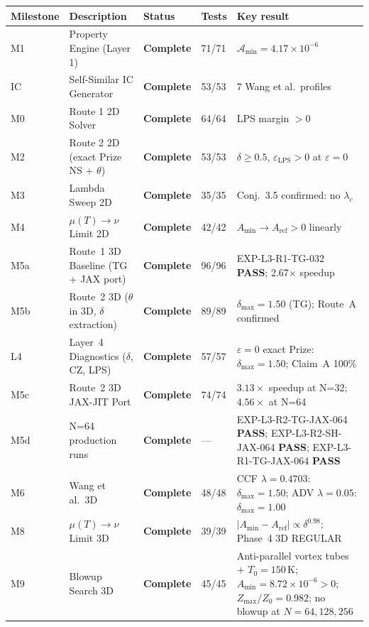 \documentclass[11pt, a4paper]{article}
\theoremstyle{definition}
\theoremstyle{remark}
\newcommand{\Afield}{\mathcal{A}}
\newcommand{\eps}{\varepsilon}
\newcommand{\lam}{\lambda}
\newcommand{\PASS}{\textcolor{passgreen}{\textbf{PASS}}}
\newcommand{\thet}{\theta}
\newcommand{\epslps}{\eps_{\mathrm{LPS}}}
\newcommand{\delt}{\delta}
\begin{document}
\begin{center}
\begin{tabular}{lllll}
\toprule
\textbf{Milestone} & \textbf{Description} & \textbf{Status} & \textbf{Tests} & \textbf{Key result} \\
\midrule
M1 & Property Engine (Layer 1) & {\color{passgreen}\textbf{Complete}} & 71/71 & $\Afield_{\min}=4.17\times10^{-6}$ \\
IC & Self-Similar IC Generator & {\color{passgreen}\textbf{Complete}} & 53/53 & 7 Wang et al.\ profiles \\
M0 & Route 1 2D Solver & {\color{passgreen}\textbf{Complete}} & 64/64 & LPS margin $>0$ \\
M2 & Route 2 2D (exact Prize NS + $\thet$) & {\color{passgreen}\textbf{Complete}} & 53/53 & $\delt\geq 0.5$, $\epslps>0$ at $\eps=0$ \\
M3 & Lambda Sweep 2D & {\color{passgreen}\textbf{Complete}} & 35/35 & Conj.~3.5 confirmed: no $\lam_c$ \\
M4 & $\mu(T)\to\nu$ Limit 2D & {\color{passgreen}\textbf{Complete}} & 42/42 & $A_{\min}\to A_{\mathrm{ref}}>0$ linearly \\
M5a & Route~1 3D Baseline (TG + JAX port) & {\color{passgreen}\textbf{Complete}} & 96/96 & EXP-L3-R1-TG-032 \PASS; 2.67$\times$ speedup \\
M5b & Route~2 3D ($\thet$ in 3D, $\delt$ extraction) & {\color{passgreen}\textbf{Complete}} & 89/89 & $\delt_{\max}=1.50$ (TG); Route~A confirmed \\
L4 & Layer~4 Diagnostics ($\delt$, CZ, LPS) & {\color{passgreen}\textbf{Complete}} & 57/57 & $\eps=0$ exact Prize: $\delt_{\max}=1.50$; Claim~A 100\% \\
M5c & Route~2 3D JAX-JIT Port & {\color{passgreen}\textbf{Complete}} & 74/74 & $3.13\times$ speedup at N=32; $4.56\times$ at N=64 \\
M5d & N=64 production runs & {\color{passgreen}\textbf{Complete}} & --- & EXP-L3-R2-TG-JAX-064 \PASS; EXP-L3-R2-SH-JAX-064 \PASS; EXP-L3-R1-TG-JAX-064 \PASS \\
M6 & Wang et al.\ 3D & {\color{passgreen}\textbf{Complete}} & 48/48 & CCF $\lam=0.4703$: $\delt_{\max}=1.50$; ADV $\lam=0.05$: $\delt_{\max}=1.00$ \\
M8 & $\mu(T)\to\nu$ Limit 3D & {\color{passgreen}\textbf{Complete}} & 39/39 & $|A_{\min}-A_{\mathrm{ref}}|\propto\delta^{0.98}$; Phase~4 3D REGULAR \\
M9 & Blowup Search 3D & {\color{passgreen}\textbf{Complete}} & 45/45 & Anti-parallel vortex tubes $+$ $T_0=150$\,K; $A_{\min}=8.72\times10^{-6}>0$; $Z_{\max}/Z_0=0.982$; no blowup at $N=64,128,256$ \\

\end{tabular}
\end{center}
\end{document}
